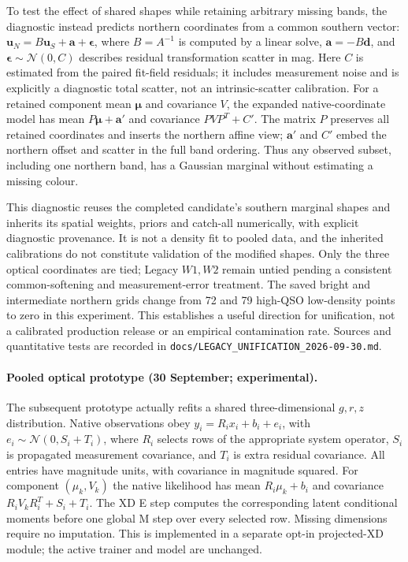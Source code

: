 \documentclass[11pt,a4paper]{article}
\begin{document}
To test the effect of shared shapes while retaining arbitrary missing bands,
the diagnostic instead predicts northern coordinates from a common southern
vector: $\boldsymbol u_N=B\boldsymbol u_S+\boldsymbol a+\boldsymbol\epsilon$,
where $B=A^{-1}$ is computed by a linear solve,
$\boldsymbol a=-B\boldsymbol d$, and
$\boldsymbol\epsilon\sim\mathcal N(0,C)$ describes residual transformation
scatter in mag. Here $C$ is estimated from the paired fit-field residuals;
it includes measurement noise and is explicitly a diagnostic total scatter,
not an intrinsic-scatter calibration. For a retained component mean
$\boldsymbol\mu$ and covariance $V$, the expanded native-coordinate model
has mean $P\boldsymbol\mu+\boldsymbol a'$ and covariance
$PVP^T+C'$. The matrix $P$ preserves all retained coordinates and inserts the
northern affine view; $\boldsymbol a'$ and $C'$ embed the northern offset and
scatter in the full band ordering. Thus any observed subset, including one
northern band, has a Gaussian marginal without estimating a missing colour.

This diagnostic reuses the completed candidate's southern marginal shapes and
inherits its spatial weights, priors and catch-all numerically, with explicit
diagnostic provenance. It is not a density fit to pooled data, and the inherited
calibrations do not constitute validation of the modified shapes. Only the
three optical coordinates are tied; Legacy $W1,W2$ remain untied pending a
consistent common-softening and measurement-error treatment. The saved bright
and intermediate northern grids change from 72 and 79 high-QSO low-density
points to zero in this experiment. This establishes a useful direction for
unification, not a calibrated production release or an empirical contamination
rate. Sources and quantitative tests are recorded in
\texttt{docs/LEGACY\_UNIFICATION\_2026-09-30.md}.

\paragraph{Pooled optical prototype (30 September; experimental).}
The subsequent prototype actually refits a shared three-dimensional $g,r,z$
distribution. Native observations obey $y_i=R_i x_i+b_i+e_i$, with
$e_i\sim\mathcal N(0,S_i+T_i)$, where $R_i$ selects rows of the appropriate
system operator, $S_i$ is propagated measurement covariance, and $T_i$ is
extra residual covariance. All entries have magnitude units, with covariance
in magnitude squared. For component $(\mu_k,V_k)$ the native likelihood has
mean $R_i\mu_k+b_i$ and covariance $R_iV_kR_i^T+S_i+T_i$.
The XD E step computes the corresponding latent conditional moments before
one global M step over every selected row. Missing dimensions require no
imputation. This is implemented in a separate opt-in projected-XD module;
the active trainer and model are unchanged.
\end{document}
